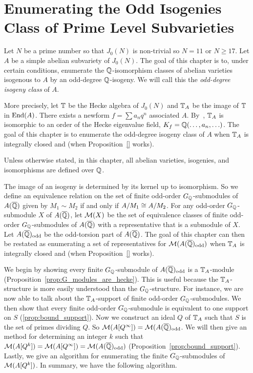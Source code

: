 \documentclass[thesis.tex]{subfiles}
\begin{document}
    
\chapter{Enumerating the Odd Isogenies Class of Prime Level Subvarieties}%
\label{chap:isogeny_class}

Let $N$ be a prime number so that $J_0(N)$ is non-trivial so $N=11$ or $N\geq
17$. Let $A$ be a simple abelian subvariety of $J_0(N)$. The goal of this
chapter is to, under certain conditions, enumerate the $\mathbb{Q}$-isomorphism
classes of abelian varieties isogenous to $A$ by an odd-degree $\mathbb{Q}$-isogeny.
We will call this the \emph{odd-degree isogeny class} of $A$.

More precisely, let $\mathbb{T}$ be the Hecke algebra of $J_0(N)$ and $\mathbb{T}_A$ be the
image of $\mathbb{T}$ in $\operatorname{End}(A)$. There exists a newform $f=\sum a_n q^n$ associated
$A$. By~\cite[Prop. 7.14]{shimura:intro}, $\mathbb{T}_A$ is isomorphic to an order of
the Hecke eigenvalue field, $K_f=\mathbb{Q}(\ldots,a_n,\ldots)$. The goal of this chapter
is to enumerate the odd-degree isogeny class of $A$ when $\mathbb{T}_A$ is integrally
closed and (when Proposition~\ref{} works).

Unless otherwise stated, in this chapter, all abelian varieties, isogenies, and
isomorphisms are defined over $\mathbb{Q}$.

The image of an isogeny is determined by its kernel up to isomorphism. So we
define an equivalence relation on the set of finite odd-order
$G_{\mathbb{Q}}$-submodules of $A(\overline{\mathbb{Q}})$ given by $M_1\sim M_2$ if and only if
$A/M_1\cong A/M_2$. For any odd-order $G_{\mathbb{Q}}$-submodule $X$ of $A(\overline{\mathbb{Q}})$, let
$\mathcal{M}(X)$ be the set of equivalence classes of finite odd-order
$G_{\mathbb{Q}}$-submodules of $A(\overline{\mathbb{Q}})$ with a representative that is a submodule of
$X$. Let $A(\overline{\mathbb{Q}})_{\mathrm{odd}}$ be the odd-torsion part of $A(\overline{\mathbb{Q}})$. The goal of
this chapter can then be restated as enumerating a set of representatives for
$\mathcal{M}(A(\overline{\mathbb{Q}})_{\mathrm{odd}})$ when $\mathbb{T}_A$ is integrally closed and (when
Proposition~\ref{} works). 

We begin by showing every finite $G_{\mathbb{Q}}$-submodule of $A(\overline{\mathbb{Q}})_{\mathrm{odd}}$ is a
$\mathbb{T}_A$-module (Proposition~\ref{prop:G_modules_are_hecke}). This is useful
because the $\mathbb{T}_A$-structure is more easily understood than the
$G_{\mathbb{Q}}$-structure. For instance, we are now able to talk about the
$\mathbb{T}_A$-support of finite odd-order $G_{\mathbb{Q}}$-submodules. We then show that every
finite odd-order $G_{\mathbb{Q}}$-submodule is equivalent to one support on $S$
(\ref{prop:bound_support}). Now we construct an ideal $Q$ of $\mathbb{T}_A$ such that
$S$ is the set of primes dividing $Q$. So $\mathcal{M}(A[Q^\infty])=\mathcal{M}(A(\overline{\mathbb{Q}})_{\mathrm{odd}}$.
We will then give an method for determining an integer $k$ such that
$\mathcal{M}(A[Q^k])=\mathcal{M}(A[Q^\infty])=\mathcal{M}(A(\overline{\mathbb{Q}})_{\mathrm{odd}})$
(Proposition~\ref{prop:bound_support}). Lastly, we give an algorithm for
enumerating the finite $G_{\mathbb{Q}}$-submodules of $\mathcal{M}(A[Q^k])$. In summary, we have
the following algorithm.
\end{document}
